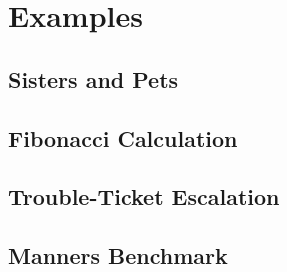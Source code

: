 \chapter{Examples}

\section{Sisters and Pets}

\section{Fibonacci Calculation}

\section{Trouble-Ticket Escalation}

\section{Manners Benchmark}

